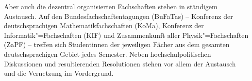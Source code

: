Aber auch die dezentral organisierten Fachschaften stehen in ständigem Austausch.
Auf den Bundesfachschaftentagungen (BuFaTas) -- Konferenz der deutschsprachigen Mathematikfachschaften (KoMa), Konferenz der Informatik"=Fachschaften (KIF) und Zusammenkunft aller Physik"=Fachschaften (ZaPF) -- treffen sich Studentinnen der jeweiligen Fächer aus dem gesamten deutschsprachigen Gebiet jedes Semester.
Neben hochschulpolitischen Diskussionen und resultierenden Resolutionen stehen vor allem der Austausch und die Vernetzung im Vordergrund.

\vfill \eject
